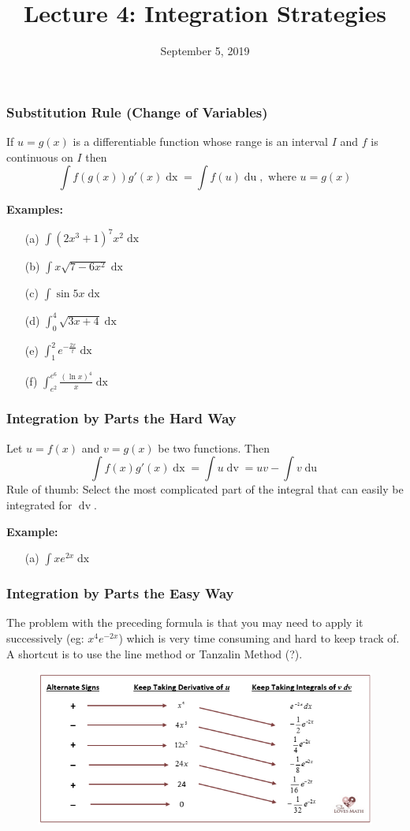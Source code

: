 \documentclass{beamer}
\title{Lecture 4: Integration Strategies}
\date{September 5, 2019}
\begin{document}
	
\frame{\titlepage}

\begin{frame}
\frametitle{Substitution Rule (Change of Variables)}
If $u=g(x)$ is a differentiable function whose range is an interval $I$ and $f$ is continuous on $I$ then
$$\int f(g(x))g'(x) \mathop{dx} = \int f(u) \mathop{du} ,\mbox{ where } u=g(x)$$

\vspace{6pt}
\textbf{Examples:}
\begin{itemize}
	\item[(a)] $\int (2x^3+1)^7x^2 \mathop{dx}$
	\item[(b)] $\int x \sqrt{7-6x^2} \mathop{dx}$
	\item[(c)] $\int \sin5x \mathop{dx}$
	\item[(d)] $\int_0^4 \sqrt{3x+4} \mathop{dx}$
	\item[(e)] $\int_1^2 e^{-\frac{2x}{t}} \mathop{dx}$
	\item[(f)] $\int_{e^2}^{e^6}\frac{(\ln x)^4}{x} \mathop{dx}$
\end{itemize}
\end{frame}

\begin{frame}
\frametitle{Integration by Parts the Hard Way}
Let $u=f(x)$ and $v=g(x)$ be two functions. Then
$$\int f(x)g'(x) \mathop{dx} =\int u \mathop{dv} = uv - \int v \mathop{du}$$
Rule of thumb: Select the most complicated part of the integral that can easily be integrated for $\mathop{dv}$.

\vspace{12pt}
\textbf{Example:}
\begin{itemize}
	\item[(a)] $\int xe^{2x} \mathop{dx}$
\end{itemize}
\end{frame}

\begin{frame}
\frametitle{Integration by Parts the Easy Way}
The problem with the preceding formula is that you may need to apply it successively (eg: $x^4e^{-2x}$) which is very time consuming and hard to keep track of. A shortcut is to use the line method or Tanzalin Method (?).
\begin{figure}
	\centering
	\includegraphics[height=.45\textheight]{line-method.png}\\
	\hspace*{10pt}\hbox{}
\end{figure}

\end{frame}
\end{document}
